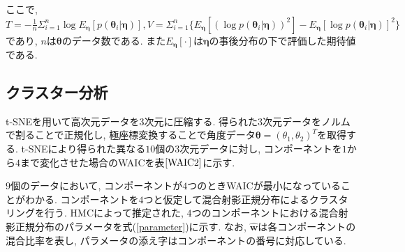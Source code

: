\documentclass[a4j,12pt]{jarticle}
\begin{document}
\noindent
ここで, $T = - \frac{1}{n} \Sigma^n_{i=1} \log E_{\bm \eta}[p(\bm \theta_i| \bm \eta)], 
V = \Sigma^n_{i=1} \{ E_{\bm \eta}[(\log p(\bm \theta_i| \bm \eta))^2] - E_{\bm \eta}[\log p(\bm \theta_i| \bm \eta)]^2 \}$であり, $n$は$\bm \theta$のデータ数である. また$E_{\bm \eta}[\cdot]$は$\bm \eta$の事後分布の下で評価した期待値である.  

\subsection{クラスター分析}

t-SNEを用いて高次元データを$3$次元に圧縮する. 得られた$3$次元データをノルムで割ることで正規化し, 極座標変換することで角度データ$\bm \theta = (\theta_1, \theta_2)^T$を取得する. t-SNEにより得られた異なる$10$個の$3$次元データに対し, コンポーネントを$1$から$4$まで変化させた場合のWAICを表$\ref{WAIC2}$に示す. 

\begin{table}[tbp]
\caption{WAICによるコンポーネントの選択結果}
\label{WAIC2}
\begin{center}
\end{center}
\end{table}

\noindent
$9$個のデータにおいて, コンポーネントが$4$つのときWAICが最小になっていることがわかる. コンポーネントを$4$つと仮定して混合射影正規分布によるクラスタリングを行う. HMCによって推定された, $4$つのコンポーネントにおける混合射影正規分布のパラメータを式(\ref{parameter})に示す. なお, $\hat {\bm w}$は各コンポーネントの混合比率を表し, パラメータの添え字はコンポーネントの番号に対応している.
\end{document}
